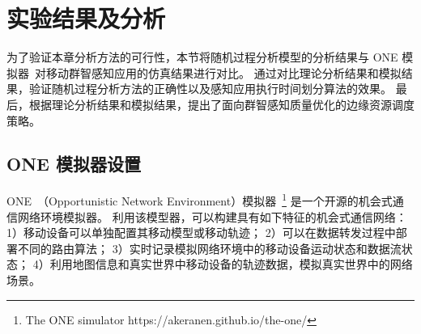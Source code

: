 \section{实验结果及分析}

为了验证本章分析方法的可行性，本节将随机过程分析模型的分析结果与 ONE 模拟器~\cite{DBLP:conf/simutools/OK09}对移动群智感知应用的仿真结果进行对比。
通过对比理论分析结果和模拟结果，验证随机过程分析方法的正确性以及感知应用执行时间划分算法的效果。
最后，根据理论分析结果和模拟结果，提出了面向群智感知质量优化的边缘资源调度策略。

\subsection{ONE 模拟器设置}
ONE~（Opportunistic Network Environment）模拟器~\footnote{The ONE simulator https://akeranen.github.io/the-one/} 是一个开源的机会式通信网络环境模拟器。
利用该模型器，可以构建具有如下特征的机会式通信网络：
1）移动设备可以单独配置其移动模型或移动轨迹；
2）可以在数据转发过程中部署不同的路由算法；
3）实时记录模拟网络环境中的移动设备运动状态和数据流状态；
4）利用地图信息和真实世界中移动设备的轨迹数据，模拟真实世界中的网络场景。

